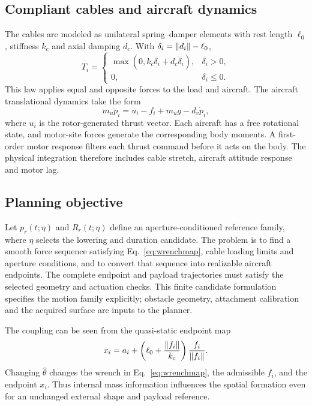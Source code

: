 \subsection{Compliant cables and aircraft dynamics}
The cables are modeled as unilateral spring--damper elements with rest length $\ell_0$, stiffness $k_c$ and axial damping $d_c$. With $\delta_i=\left\lVert d_i\right\rVert-\ell_0$,
\begin{equation}
 T_i=\begin{cases}
 \max(0,k_c\delta_i+d_c\dot\delta_i),&\delta_i>0,\\
 0,&\delta_i\leq0.
 \end{cases}
 \label{eq:cable}
\end{equation}
This law applies equal and opposite forces to the load and aircraft. The aircraft translational dynamics take the form
\begin{equation}
 m_u\ddot p_i=u_i-f_i+m_ug-d_v\dot p_i,
 \label{eq:uav}
\end{equation}
where $u_i$ is the rotor-generated thrust vector. Each aircraft has a free rotational state, and motor-site forces generate the corresponding body moments. A first-order motor response filters each thrust command before it acts on the body. The physical integration therefore includes cable stretch, aircraft attitude response and motor lag.

\subsection{Planning objective}
Let $p_r(t;\eta)$ and $R_r(t;\eta)$ define an aperture-conditioned reference family, where $\eta$ selects the lowering and duration candidate. The problem is to find a smooth force sequence satisfying Eq.~\eqref{eq:wrenchmap}, cable loading limits and aperture conditions, and to convert that sequence into realizable aircraft endpoints. The complete endpoint and payload trajectories must satisfy the selected geometry and actuation checks. This finite candidate formulation specifies the motion family explicitly; obstacle geometry, attachment calibration and the acquired surface are inputs to the planner.

The coupling can be seen from the quasi-static endpoint map
\begin{equation}
 x_i=a_i+\left(\ell_0+\frac{\left\lVert f_i\right\rVert}{k_c}\right)\frac{f_i}{\left\lVert f_i\right\rVert}.
 \label{eq:endpointmap}
\end{equation}
Changing $\hat\theta$ changes the wrench in Eq.~\eqref{eq:wrenchmap}, the admissible $f_i$, and the endpoint $x_i$. Thus internal mass information influences the spatial formation even for an unchanged external shape and payload reference.
